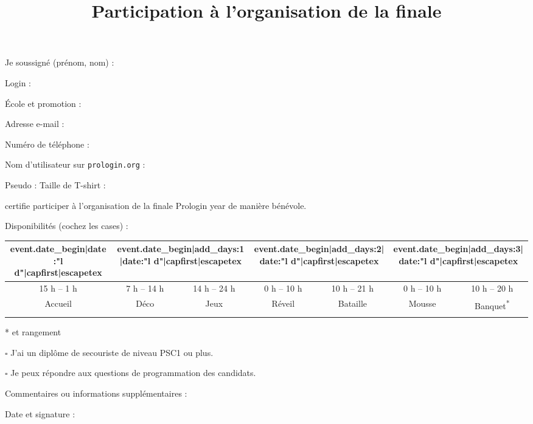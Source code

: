 \documentclass[a4paper,11pt]{prologin}
\title{Participation à l'organisation de la finale}
\begin{document}
{
Je soussigné (prénom, nom) : \hrulefill

Login : \hrulefill

École et promotion : \hrulefill

Adresse e-mail : \hrulefill

Numéro de téléphone : \hrulefill

Nom d'utilisateur sur \texttt{prologin.org} : \hrulefill

Pseudo : \hrulefill \hspace{0.1cm}
Taille de T-shirt : \hrulefill

}

certifie participer à l'organisation de la finale Prologin {{ year }} de
manière bénévole.

Disponibilités (cochez les cases) :

\begin{center}
\begin{tabular}{|c|c|c|c|c|c|c|}

\hline
{{ event.date_begin|date:"l d"|capfirst|escapetex }} &
\multicolumn{2}{c|}{ {{ event.date_begin|add_days:1|date:"l d"|capfirst|escapetex }} } &
\multicolumn{2}{c|}{ {{ event.date_begin|add_days:2|date:"l d"|capfirst|escapetex }} } &
\multicolumn{2}{c|}{ {{ event.date_begin|add_days:3|date:"l d"|capfirst|escapetex }} }
\tabularnewline
\hline
15 h -- 1 h & 7 h -- 14 h & 14 h -- 24 h & 0 h -- 10 h & 10 h -- 21 h &
0 h -- 10 h & 10 h -- 20 h\tabularnewline
\hline
Accueil & Déco & Jeux & Réveil & Bataille & Mousse & Banquet\textsuperscript{*}\tabularnewline
\hline
&&&&&&\tabularnewline
\hline
\end{tabular}
\end{center}

* et rangement

{\Large$\square$} J'ai un diplôme de secouriste de niveau PSC1 ou plus.

{\Large$\square$} Je peux répondre aux questions de programmation des candidats.

\vspace{0.5cm}

Commentaires ou informations supplémentaires :

\vspace{3cm}

Date et signature :
\end{document}
